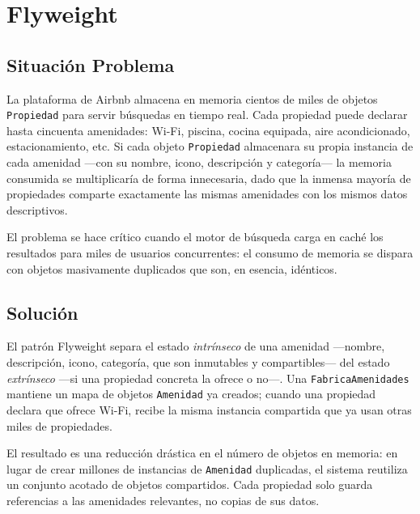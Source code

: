 
\chapter{Flyweight}

\section{Situación Problema}

La plataforma de Airbnb almacena en memoria cientos de miles de objetos
\texttt{Propiedad} para servir búsquedas en tiempo real. Cada propiedad
puede declarar hasta cincuenta amenidades: Wi-Fi, piscina, cocina
equipada, aire acondicionado, estacionamiento, etc. Si cada objeto
\texttt{Propiedad} almacenara su propia instancia de cada amenidad —con
su nombre, icono, descripción y categoría— la memoria consumida se
multiplicaría de forma innecesaria, dado que la inmensa mayoría de
propiedades comparte exactamente las mismas amenidades con los mismos
datos descriptivos.

El problema se hace crítico cuando el motor de búsqueda carga en caché
los resultados para miles de usuarios concurrentes: el consumo de memoria
se dispara con objetos masivamente duplicados que son, en esencia,
idénticos.

\section{Solución}

El patrón Flyweight separa el estado \emph{intrínseco} de una amenidad
—nombre, descripción, icono, categoría, que son inmutables y compartibles—
del estado \emph{extrínseco} —si una propiedad concreta la ofrece o no—.
Una \texttt{FabricaAmenidades} mantiene un mapa de objetos
\texttt{Amenidad} ya creados; cuando una propiedad declara que ofrece
Wi-Fi, recibe la misma instancia compartida que ya usan otras miles de
propiedades.

El resultado es una reducción drástica en el número de objetos en memoria:
en lugar de crear millones de instancias de \texttt{Amenidad} duplicadas,
el sistema reutiliza un conjunto acotado de objetos compartidos. Cada
propiedad solo guarda referencias a las amenidades relevantes, no copias
de sus datos.

